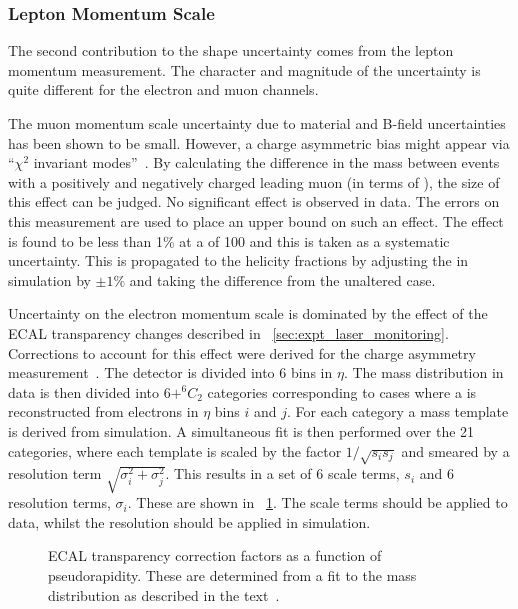 \subsubsection{Lepton Momentum Scale}
The second contribution to the \LP shape uncertainty comes from the lepton
momentum measurement. The character and magnitude of the uncertainty is quite
different for the electron and muon channels.

The muon momentum scale uncertainty due to material and B-field uncertainties
has been shown to be small. However, a charge asymmetric \Pt bias might appear
via ``$\chi^2$ invariant modes''~\cite[section
2.4]{matthias_edelhoff_thesis}. By calculating the difference in the \PZ mass
between events with a positively and negatively charged leading muon (in terms
of \Pt), the size of this effect can be judged. No significant effect is
observed in data. The errors on this measurement are used to place an upper
bound on such an effect. The effect is found to be less than 1\% at a \Ptmu of
\unit{100}{\GeV} and this is taken as a systematic uncertainty. This is
propagated to the helicity fractions by adjusting the \Ptmu in simulation by
$\pm 1\%$ and taking the difference from the unaltered case.

Uncertainty on the electron momentum scale is dominated by the effect of the
\ac{ECAL} transparency changes described in
\sec~\ref{sec:expt_laser_monitoring}. Corrections to account for this effect
were derived for the \PW charge asymmetry
measurement~\cite{w_charge_asymmetry}. The detector is divided into 6 bins in
$\eta$. The \Zee mass distribution in data is then divided into $6 + ^6C_2$
categories corresponding to cases where a \PZ is reconstructed from electrons in
$\eta$ bins $i$ and $j$.  For each category a mass template is derived from
simulation. A simultaneous fit is then performed over the 21 categories, where
each template is scaled by the factor $1/\sqrt{s_is_j}$ and smeared by a
resolution term $\sqrt{\sigma_i^2 + \sigma_j^2}$. This results in a set of 6
scale terms, $s_i$ and 6 resolution terms, $\sigma_i$. These are shown in
\fig~\ref{fig:wpol_ecal_transp_corr}.  The scale terms should be applied to
data, whilst the resolution should be applied in simulation.

\begin{figure}[h!]
  \centering
  \quad
  \quad
  \caption{\ac{ECAL} transparency correction factors as a function of
    pseudorapidity. These are determined from a fit to the \PZ mass distribution
    as described in the text~\cite{w_charge_asymmetry_an}.}
\label{fig:wpol_ecal_transp_corr}
\end{figure}

